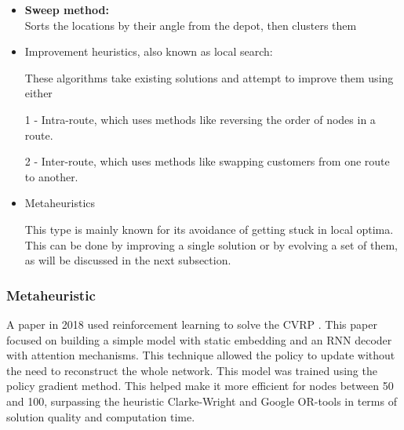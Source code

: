 \documentclass[a4paper]{report}
\begin{document}
{\begin{itemize}
\begin{itemize}
\begin{itemize}
        \item \textbf{Sweep method:} \\
        Sorts the locations by their angle from the depot, then clusters them
    \end{itemize}
\end{itemize}
\begin{itemize}
    \item Improvement heuristics, also known as local search:

These algorithms take existing solutions and attempt to improve them using either

1 - Intra-route, which uses methods like reversing the order of nodes in a route.

2 - Inter-route, which uses methods like swapping customers from one route to another.


\end{itemize}
\begin{itemize}
    \item Metaheuristics

This type is mainly known for its avoidance of getting stuck in local optima. This can be done by improving a single solution or by evolving a set of them, as will be discussed in the next subsection.
\end{itemize}

\subsubsection{Metaheuristic}


A paper in 2018 used reinforcement learning to solve the CVRP \cite{metavrp}. This paper focused on building a simple model with static embedding and an RNN decoder with attention mechanisms. This technique allowed the policy to update without the need to reconstruct the whole network. This model was trained using the policy gradient method. This helped make it more efficient for nodes between 50 and 100, surpassing the heuristic Clarke-Wright and Google OR-tools in terms of solution quality and computation time.


\end{itemize}}
\end{document}
